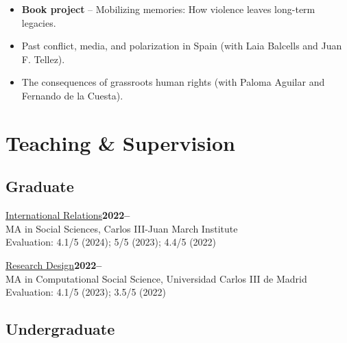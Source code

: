 \documentclass[a4paper, 12pt]{article}
\begin{document}
\begin{itemize}[leftmargin=*, nolistsep]
\item \textbf{Book project} -- Mobilizing memories: How violence leaves long-term legacies.
\item Past conflict, media, and polarization in Spain (with Laia Balcells and Juan F. Tellez).
\item The consequences of grassroots human rights (with Paloma Aguilar and Fernando de la Cuesta).
\end{itemize}

\section*{Teaching \& Supervision}


\subsection*{Graduate}

\noindent
\href{https://raw.githack.com/franvillamil/syllabi/master/current/syllabus_IR.pdf}{International Relations}\hfill\textbf{2022--}\\
{\small MA in Social Sciences, Carlos III-Juan March Institute}\\
{\small Evaluation: 4.1/5 (2024); 5/5 (2023); 4.4/5 (2022)}
\vspace{10pt}

\noindent
\href{https://github.com/franvillamil/syllabi/blob/master/current/syllabus_research_design.pdf}{Research Design}\hfill\textbf{2022--}\\
{\small MA in Computational Social Science, Universidad Carlos III de Madrid}\\
{\small Evaluation: 4.1/5 (2023); 3.5/5 (2022)}

\subsection*{Undergraduate}
\end{document}
